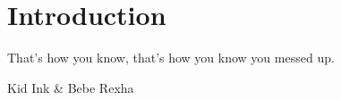 \chapter{Introduction}

\epigraph{That's how you know, that's how you know you messed up.}{Kid Ink \& Bebe Rexha}